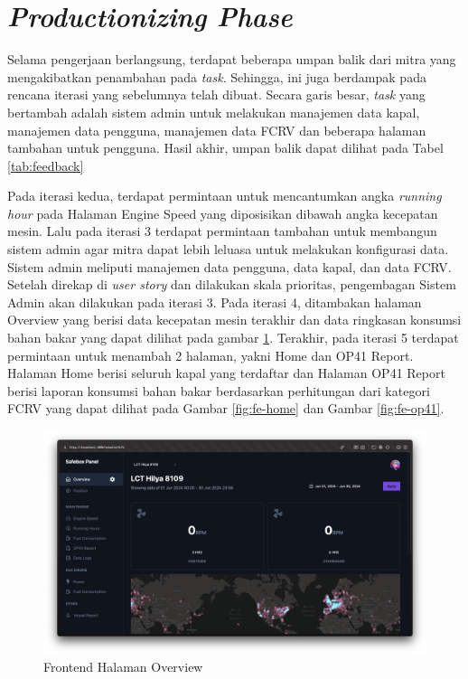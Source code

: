 \section{\textit{Productionizing Phase}}

Selama pengerjaan berlangsung, terdapat beberapa umpan balik dari mitra yang mengakibatkan penambahan pada \textit{task}. Sehingga, ini juga berdampak pada rencana iterasi yang sebelumnya telah dibuat. Secara garis besar, \textit{task} yang bertambah adalah sistem admin untuk melakukan manajemen data kapal, manajemen data pengguna, manajemen data FCRV dan beberapa halaman tambahan untuk pengguna. Hasil akhir, umpan balik dapat dilihat pada Tabel \ref{tab:feedback}



Pada iterasi kedua, terdapat permintaan untuk mencantumkan angka \textit{running hour} pada Halaman Engine Speed yang diposisikan dibawah angka kecepatan mesin. Lalu pada iterasi 3 terdapat permintaan tambahan untuk membangun sistem admin agar mitra dapat lebih leluasa untuk melakukan konfigurasi data. Sistem admin meliputi manajemen data pengguna, data kapal, dan data FCRV. Setelah direkap di \textit{user story} dan dilakukan skala prioritas, pengembagan Sistem Admin akan dilakukan pada iterasi 3. Pada iterasi 4, ditambakan halaman Overview yang berisi data kecepatan mesin terakhir dan data ringkasan konsumsi bahan bakar yang dapat dilihat pada gambar \ref{fig:fe-overview}. Terakhir, pada iterasi 5 terdapat permintaan untuk menambah 2 halaman, yakni Home dan OP41 Report. Halaman Home berisi seluruh kapal yang terdaftar dan Halaman OP41 Report berisi laporan konsumsi bahan bakar berdasarkan perhitungan dari kategori FCRV yang dapat dilihat pada Gambar \ref{fig:fe-home} dan Gambar \ref{fig:fe-op41}.

\begin{figure}[!h]
    \includegraphics[width=1.05\linewidth, center]{images/hasil/iterations/4/fe-overview.png}
    \caption{Frontend Halaman Overview}
    \label{fig:fe-overview}
\end{figure}

